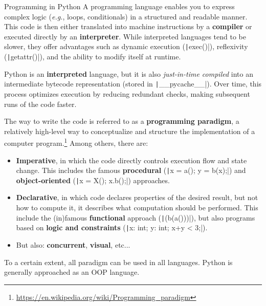 \documentclass[10pt,
aspectratio=169
]{beamer}
\begin{document}
\begin{frame}{Programming in Python}
	A programming language enables you to express complex logic (\textit{e.g.}, loops, conditionals) in a structured and readable manner. This code is then either translated into machine instructions by a \textbf{compiler} or executed directly by an \textbf{interpreter}. While interpreted languages tend to be slower, they offer advantages such as dynamic execution (\texttt|exec()|), reflexivity (\texttt|getattr()|), and the ability to modify itself at runtime.
	
	Python is an \textbf{interpreted} language, but it is also \textit{just-in-time compiled} into an intermediate bytecode representation (stored in \texttt|__pycache__|). Over time, this process optimizes execution by reducing redundant checks, making subsequent runs of the code faster.
\end{frame}



\begin{frame}[fragile]
	The way to write the code is referred to as a \textbf{programming paradigm}, a relatively high-level way to conceptualize and structure the implementation of a computer program.\footnote{\url{https://en.wikipedia.org/wiki/Programming_paradigm}} Among others, there are:\begin{itemize}
		\item \textbf{Imperative}, in which the code directly controls execution flow and state change. This includes the famous \textbf{procedural} (\texttt|x = a(); y = b(x);|) and \textbf{object-oriented} (\texttt|x = X(); x.b();|) approaches.
		\item \textbf{Declarative}, in which code declares properties of the desired result, but not how to compute it, it describes what computation should be performed. This include the (in)famous \textbf{functional} approach (\texttt|(b(a()))|), but also programs based on \textbf{logic and constraints} (\texttt|x: int; y: int; x+y < 3;|).
		\item But also: \textbf{concurrent}, \textbf{visual}, etc...
	\end{itemize}
	
	To a certain extent, all paradigm can be used in all languages. Python is generally approached as an OOP language.
	\vspace{1em}
\end{frame}
\end{document}
